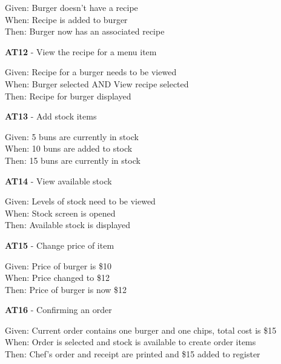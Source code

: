 \begin{small}
Given: Burger doesn't have a recipe\\
When: Recipe is added to burger\\
Then: Burger now has an associated recipe\\
\end{small}
\linebreak
\textbf{AT12} - View the recipe for a menu item\\
\begin{small}
Given: Recipe for a burger needs to be viewed\\
When: Burger selected AND View recipe selected\\
Then: Recipe for burger displayed\\
\end{small}
\linebreak
\textbf{AT13} - Add stock items\\
\begin{small}
Given: 5 buns are currently in stock\\
When: 10 buns are added to stock\\
Then: 15 buns are currently in stock\\
\end{small}
\linebreak
\textbf{AT14} - View available stock\\
\begin{small}
Given: Levels of stock need to be viewed\\
When: Stock screen is opened\\
Then: Available stock is displayed\\
\end{small}
\linebreak
\textbf{AT15} - Change price of item\\
\begin{small}
Given: Price of burger is \$10\\
When: Price changed to \$12\\
Then: Price of burger is now \$12\\
\end{small}
\linebreak
\textbf{AT16} - Confirming an order\\
\begin{small}
Given: Current order contains one burger and one chips, total cost is \$15\\
When: Order is selected and stock is available to create order items\\
Then: Chef's order and receipt are printed and \$15 added to register\\
\end{small}
\linebreak

